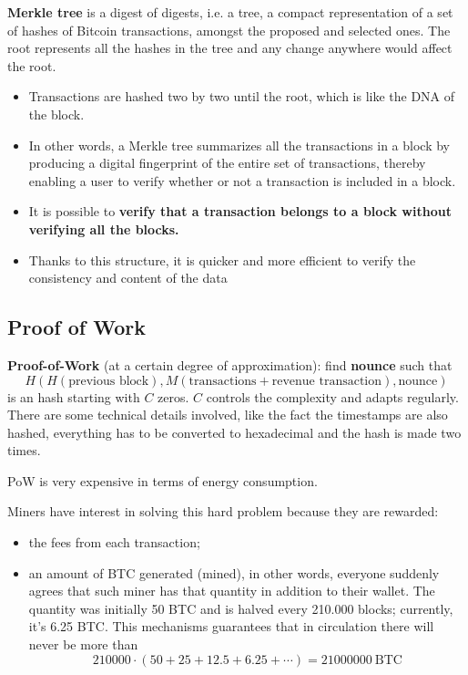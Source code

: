 \textbf{Merkle tree} is a digest of digests, i.e. a tree, a compact representation of a set of hashes of Bitcoin transactions, amongst the proposed and selected ones. The root represents all the hashes in the tree and any change anywhere would affect the root.
\begin{itemize}
	\item Transactions are hashed two by two until the root, which is like the DNA of the block.
	\item In other words, a Merkle tree summarizes all the transactions in a block by producing a digital fingerprint of the entire set of transactions, thereby enabling a user to verify whether or not a transaction is included in a block.
	\item It is possible to \textbf{verify that a transaction belongs to a block without verifying all the blocks.}
	\item Thanks to this structure, it is quicker and more efficient to verify the consistency and content of the data
\end{itemize}


\subsection{Proof of Work}

\textbf{Proof-of-Work} (at a certain degree of approximation): find \textbf{nounce} such that 
\begin{equation*}
	H\left( H\left(\text{previous block}\right) ,M\left(\text{transactions} +\text{revenue transaction}\right) ,\text{nounce}\right)
\end{equation*}
is an hash starting with $C$ zeros. $C$ controls the complexity and adapts regularly. There are some technical details involved, like the fact the timestamps are also hashed, everything has to be converted to hexadecimal and the hash is made two times.

PoW is very expensive in terms of energy consumption.

Miners have interest in solving this hard problem because they are rewarded:
\begin{itemize}
	\item the fees from each transaction;
	\item an amount of BTC generated (mined), in other words, everyone suddenly agrees that such miner has that quantity in addition to their wallet. The quantity was initially 50 BTC and is halved every 210.000 blocks; currently, it's 6.25 BTC. This mechanisms guarantees that in circulation there will never be more than\begin{equation*}
	      210000\cdot ( 50+25+12.5+6.25+\cdots ) =21000000\ \text{BTC}
	\end{equation*}
\end{itemize}
